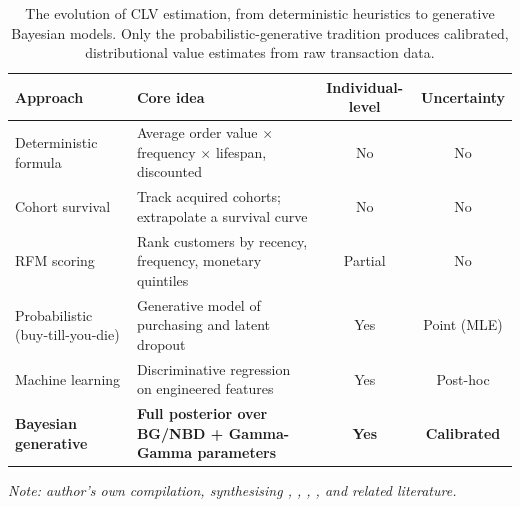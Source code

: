 \begin{table}[htbp]
  \centering
  \caption{The evolution of CLV estimation, from deterministic heuristics to generative Bayesian models. Only the probabilistic-generative tradition produces calibrated, distributional value estimates from raw transaction data.}
  \label{tab:evolution}
  \begin{tabularx}{\linewidth}{@{}l Y c c@{}}
    \toprule
    \textbf{Approach} & \textbf{Core idea} & \textbf{Individual-level} & \textbf{Uncertainty} \\
    \midrule
    Deterministic formula & Average order value $\times$ frequency $\times$ lifespan, discounted & No & No \\
    \addlinespace
    Cohort survival & Track acquired cohorts; extrapolate a survival curve & No & No \\
    \addlinespace
    RFM scoring & Rank customers by recency, frequency, monetary quintiles & Partial & No \\
    \addlinespace
    Probabilistic (buy-till-you-die) & Generative model of purchasing and latent dropout & Yes & Point (MLE) \\
    \addlinespace
    Machine learning & Discriminative regression on engineered features & Yes & Post-hoc \\
    \addlinespace
    \textbf{Bayesian generative} & \textbf{Full posterior over BG/NBD + Gamma-Gamma parameters} & \textbf{Yes} & \textbf{Calibrated} \\
    \bottomrule
  \end{tabularx}
  \par\vspace{3pt}
  {\footnotesize\itshape Note: author's own compilation, synthesising \textcite{blattberg1996}, \textcite{schmittlein1987}, \textcite{fader2005}, \textcite{chamberlain2017}, and related literature.}
\end{table}
